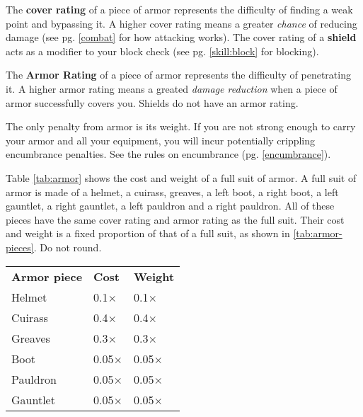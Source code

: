 \begin{multicols}{2}
    The \textbf{cover rating} of a piece of armor represents the difficulty of
    finding a weak point and bypassing it. A higher cover rating means a greater \textit{chance}
    of reducing damage (see pg. \ref{combat} for how attacking works). The cover
    rating of a \textbf{shield} acts as a modifier to your block check (see pg.
    \ref{skill:block} for blocking).

    The \textbf{Armor Rating} of a piece of armor represents the difficulty of
    penetrating it. A higher armor rating means a greated \textit{damage reduction}
    when a piece of armor successfully covers you. Shields do not have an armor
    rating.

    The only penalty from armor is its weight. If you are not strong enough to
    carry your armor and all your equipment, you will incur potentially
    crippling encumbrance penalties. See the rules on encumbrance (pg.
    \ref{encumbrance}).

    Table \ref{tab:armor} shows the cost and weight of a full suit of armor. A full
    suit of armor is made of a helmet, a cuirass, greaves, a left boot, a right
    boot, a left gauntlet, a right gauntlet, a left pauldron and a right pauldron.
    All of these pieces have the same cover rating and armor rating as the full
    suit. Their cost and weight is a fixed proportion of that of a full suit, as
    shown in \ref{tab:armor-pieces}. Do not round.
    \begin{center}
        \unclassedrowcolors
        \begin{tabularx}{0.5\textwidth}{l l l}
            \textbf{Armor piece} & \textbf{Cost} & \textbf{Weight} \\
            Helmet & 0.1$\times$ & 0.1$\times$ \\
            Cuirass & 0.4$\times$ & 0.4$\times$ \\
            Greaves & 0.3$\times$ & 0.3$\times$ \\
            Boot & 0.05$\times$ & 0.05$\times$ \\
            Pauldron & 0.05$\times$ & 0.05$\times$ \\
            Gauntlet & 0.05$\times$ & 0.05$\times$ \\
        \end{tabularx}
        \label{tab:armor-pieces}
    \end{center}


\end{multicols}
